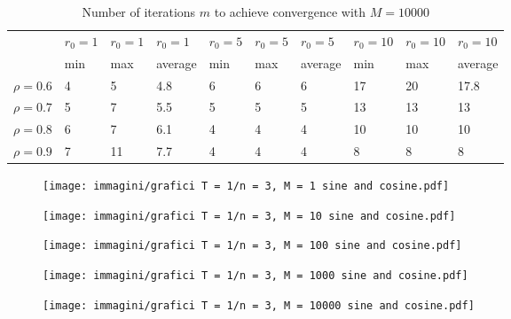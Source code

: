 \documentclass[a4paper,11pt,openright]{report}
\begin{document}
\begin{table}[H]
\centering
\addtolength{\leftskip}{-1.5cm}
\addtolength{\rightskip}{-1.5cm}
\begin{tabular}{|c|lllllllll|}
\hline
$ $ & $r_0 = 1$ & $r_0 = 1$ & $r_0 = 1$ & $r_0 = 5$ & $r_0 = 5$ & $r_0 = 5$ & $r_0 = 10$ & $r_0 = 10$ & $r_0 = 10$  \\
$ $ & min & max & average & min & max & average & min & max & average \\ 
\hline
$\rho = 0.6$ & 4 & 5 & 4.8 & 6 & 6 & 6 & 17 & 20 & 17.8 \\

$\rho = 0.7$ & 5 & 7 & 5.5 & 5 & 5 & 5 & 13 & 13 & 13\\

$\rho = 0.8$ & 6 & 7 & 6.1 & 4 & 4 & 4 & 10 & 10 & 10\\

$\rho = 0.9$ & 7 & 11 & 7.7 & 4 & 4 & 4 & 8 & 8 & 8\\
\hline
\end{tabular}
\caption{Number of iterations $m$ to achieve convergence with $M = 10000$}
\end{table}
\begin{figure}[H]
\centering
\texttt{[image: immagini/grafici T = 1/n = 3, M = 1 sine and cosine.pdf]}
\end{figure}
\begin{figure}[H]
\centering
\texttt{[image: immagini/grafici T = 1/n = 3, M = 10 sine and cosine.pdf]}
\end{figure}
\begin{figure}[H]
\centering
\texttt{[image: immagini/grafici T = 1/n = 3, M = 100 sine and cosine.pdf]}
\end{figure}
\begin{figure}[H]
\centering
\texttt{[image: immagini/grafici T = 1/n = 3, M = 1000 sine and cosine.pdf]}
\end{figure}
\begin{figure}[H]
\centering
\texttt{[image: immagini/grafici T = 1/n = 3, M = 10000 sine and cosine.pdf]}
\end{figure}
\newpage
\end{document}
